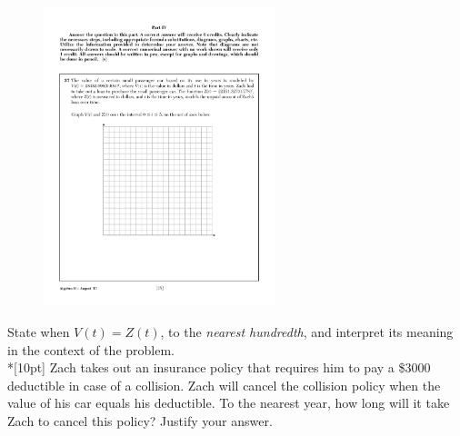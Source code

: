 \documentclass[12pt, oneside]{article}
\begin{document}
\begin{enumerate}
  \begin{figure}[!ht]
      \centering
      \includegraphics[width=0.6\textwidth]{1stQ-grid.pdf}
  \end{figure}

  State when $V(t) = Z(t)$, to the \textit{nearest hundredth}, and interpret its meaning in the context of the problem.\\*[10pt]
  Zach takes out an insurance policy that requires him to pay a \$3000 deductible in case of a collision. Zach will cancel the collision policy when the value of his car equals his deductible.
  To the nearest year, how long will it take Zach to cancel this policy? Justify your answer.
\end{enumerate}


\newpage
\end{document}
